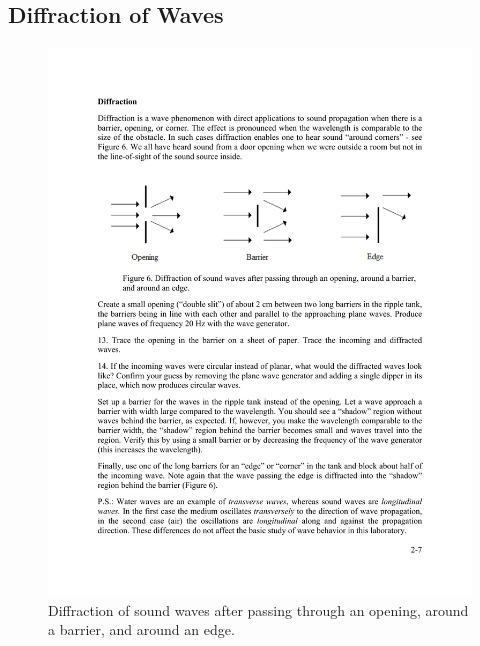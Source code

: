 \documentclass[11pt]{NSF}
\begin{document}
\subsection{Diffraction of Waves}


%
\begin{figure}[hbtp]
\begin{center}
\includegraphics[width=.95\textwidth]{fig2_7}
\caption{Diffraction of sound waves after passing through an opening, 
around a barrier, and around an edge.}
\label{f:6}
\end{center}
\end{figure}
%
\end{document}
